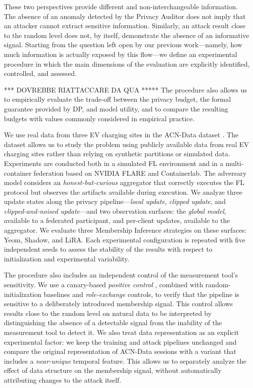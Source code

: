 These two perspectives provide different and non-interchangeable information. The absence of an anomaly detected by the Privacy Auditor does not imply that an attacker cannot extract sensitive information. Similarly, an attack result close to the random level does not, by itself, demonstrate the absence of an informative signal. Starting from the question left open by our previous work---namely, how much information is actually exposed by this flow---we define an experimental procedure in which the main dimensions of the evaluation are explicitly identified, controlled, and assessed. 

*** DOVREBBE RIATTACCARE DA QUA *****
The procedure also allows us to empirically evaluate the trade-off between the privacy budget, the formal guarantee provided by DP, and model utility, and to compare the resulting budgets with values commonly considered in empirical practice.

We use real data from three EV charging sites in the ACN-Data dataset \cite{lee2019acndata}. The dataset allows us to study the problem using publicly available data from real EV charging sites rather than relying on synthetic partitions or simulated data. Experiments are conducted both in a simulated FL environment and in a multi-container federation based on NVIDIA FLARE and Containerlab. The adversary model considers an \textit{honest-but-curious} aggregator that correctly executes the FL protocol but observes the artifacts available during execution. We analyze three update states along the privacy pipeline---\textit{local update}, \textit{clipped update}, and \textit{clipped-and-noised update}---and two observation surfaces: the \textit{global model}, available to a federated participant, and per-client updates, available to the aggregator. We evaluate three Membership Inference strategies on these surfaces: Yeom, Shadow, and LiRA. Each experimental configuration is repeated with five independent seeds to assess the stability of the results with respect to initialization and experimental variability.

The procedure also includes an independent control of the measurement tool's sensitivity. We use a canary-based \textit{positive control} \cite{maddock2023canife}, combined with random-initialization baselines and \textit{role-exchange} controls, to verify that the pipeline is sensitive to a deliberately introduced membership signal. This control allows results close to the random level on natural data to be interpreted by distinguishing the absence of a detectable signal from the inability of the measurement tool to detect it. We also treat data representation as an explicit experimental factor: we keep the training and attack pipelines unchanged and compare the original representation of ACN-Data sessions with a variant that includes a \textit{near-unique} temporal feature. This allows us to separately analyze the effect of data structure on the membership signal, without automatically attributing changes to the attack itself.

